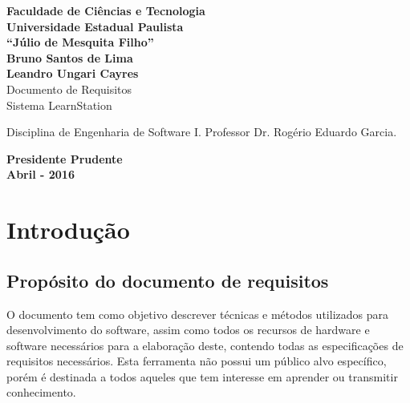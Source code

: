 \documentclass[12pt,a4paper,onecolumn,titlepage]{article}
\begin{document}

\begin{titlepage} %
	
	\vfill
	\begin{center}
	
		{\large \textbf{Faculdade de Ciências e Tecnologia\\Universidade Estadual Paulista\\``Júlio de Mesquita Filho''}} \\[3cm]
		{\large \textbf{Bruno Santos de Lima}}\\
		{\large \textbf{Leandro Ungari Cayres}}\\[4cm]
		{\Large Documento de Requisitos}\\
		{\Large Sistema LearnStation}\\[4cm]

	\hspace{.45\textwidth} %
	\begin{minipage}{.5\textwidth}
		\large Disciplina de Engenharia de Software I. Professor Dr. Rogério Eduardo Garcia.\\[0.5cm]
	\end{minipage}

	\vfill
	\vspace{1.5cm}
	
	\large \textbf{Presidente Prudente\\}
	\large \textbf{Abril - 2016}
	
	\end{center}
	
\end{titlepage}

\section{Introdução}
\label{sect:intro}

\subsection{Propósito do documento de requisitos}

O documento tem como objetivo descrever técnicas e métodos utilizados para desenvolvimento do software, assim como todos os recursos de hardware e software necessários para a elaboração deste, contendo todas as especificações de requisitos necessários. Esta ferramenta não possui um público alvo específico, porém é destinada a todos aqueles que tem interesse em aprender ou transmitir conhecimento.
\end{document}
